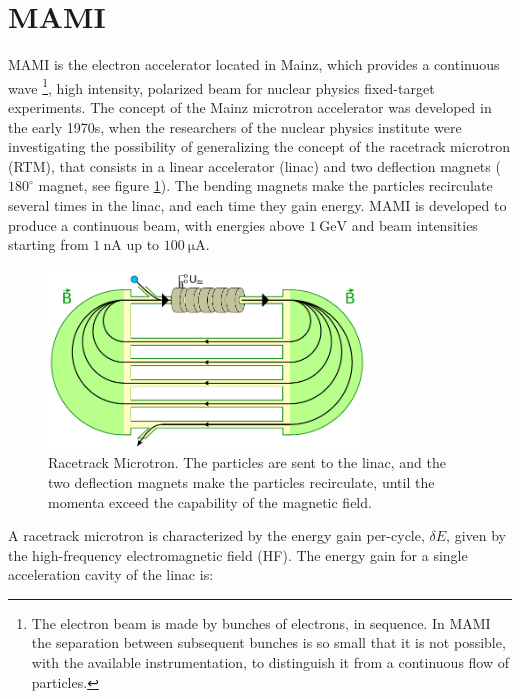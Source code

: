\section{MAMI}

MAMI is the electron accelerator located in Mainz, which provides a continuous wave \footnote{The electron beam is made by bunches of electrons, in sequence. In MAMI the separation between subsequent bunches is so small that it is not possible, with the available instrumentation, to distinguish it from a continuous flow of particles.}, high intensity, polarized beam for nuclear physics fixed-target experiments. The concept of the Mainz microtron accelerator was developed in the early 1970s, when the researchers of the nuclear physics institute were investigating the possibility of generalizing the concept of the racetrack microtron (RTM), that consists in a linear accelerator (linac) and two deflection magnets ($180^{\circ}$ magnet, see figure \ref{fig:RaceTrackSketch}). The bending magnets make the particles recirculate several times in the linac, and each time they gain energy. MAMI is developed to produce a continuous beam, with energies above $\SI{1}{\giga \electronvolt}$ and beam intensities starting from $\SI{1}{\nano \ampere}$ up to $\SI{100}{\micro \ampere}$.

\begin{figure}[hbtp]

\centering
\includegraphics[width = 0.75\textwidth]{ExperimentalSetup/RacetrackMicrotronSketch.pdf}
\caption{Racetrack Microtron. The particles are sent to the linac, and the two deflection magnets make the particles recirculate, until the momenta exceed the capability of the magnetic field.}
\label{fig:RaceTrackSketch}
\end{figure}

A racetrack microtron is characterized by the energy gain per-cycle, $\delta E$, given by the high-frequency electromagnetic field (HF). The energy gain for a single acceleration cavity of the linac is: 

